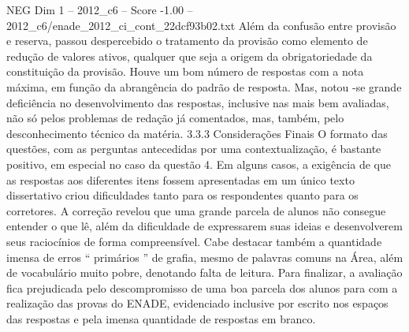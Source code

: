 \begin{textsample}{NEG Dim 1 – 2012\_c6 – Score -1.00 – 2012\_c6/enade\_2012\_ci\_cont\_22dcf93b02.txt}
Além da confusão entre provisão e reserva, passou despercebido o tratamento da provisão como elemento de redução de valores ativos, qualquer que seja a origem da obrigatoriedade da constituição da provisão.
Houve um bom número de respostas com a nota máxima, em função da abrangência do padrão de resposta.
Mas, notou -se grande deficiência no desenvolvimento das respostas, inclusive nas mais bem avaliadas, não só pelos problemas de redação já comentados, mas, também, pelo desconhecimento técnico da matéria. 3.3.3 Considerações Finais O formato das questões, com as perguntas antecedidas por uma contextualização, é bastante positivo, em especial no caso da questão 4.
Em alguns casos, a exigência de que as respostas aos diferentes itens fossem apresentadas em um único texto dissertativo criou dificuldades tanto para os respondentes quanto para os corretores.
A correção revelou que uma grande parcela de alunos não consegue entender o que lê, além da dificuldade de expressarem suas ideias e desenvolverem seus raciocínios de forma compreensível.
Cabe destacar também a quantidade imensa de erros “ primários ” de grafia, mesmo de palavras comuns na Área, além de vocabulário muito pobre, denotando falta de leitura.
Para finalizar, a avaliação fica prejudicada pelo descompromisso de uma boa parcela dos alunos para com a realização das provas do ENADE, evidenciado inclusive por escrito nos espaços das respostas e pela imensa quantidade de respostas em branco.

\end{textsample}
